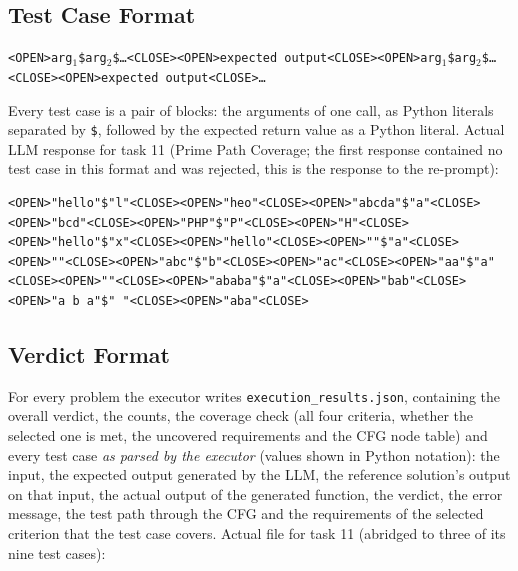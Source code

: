 \documentclass[12pt, a4paper]{article}
\begin{document}
\subsection{Test Case Format}

\begin{center}
\texttt{<OPEN>arg$_1$\$arg$_2$\$\ldots<CLOSE><OPEN>expected output<CLOSE><OPEN>arg$_1$\$arg$_2$\$\ldots<CLOSE><OPEN>expected output<CLOSE>\ldots}
\end{center}
Every test case is a pair of blocks: the arguments of one call, as Python literals separated by \texttt{\$}, followed by the expected return value as a Python literal. Actual LLM response for task 11 (Prime Path Coverage; the first response contained no test case in this format and was rejected, this is the response to the re-prompt):

\begin{lstlisting}[style=plain, caption={Generated test cases, task 11}]
<OPEN>"hello"$"l"<CLOSE><OPEN>"heo"<CLOSE><OPEN>"abcda"$"a"<CLOSE><OPEN>"bcd"<CLOSE><OPEN>"PHP"$"P"<CLOSE><OPEN>"H"<CLOSE><OPEN>"hello"$"x"<CLOSE><OPEN>"hello"<CLOSE><OPEN>""$"a"<CLOSE><OPEN>""<CLOSE><OPEN>"abc"$"b"<CLOSE><OPEN>"ac"<CLOSE><OPEN>"aa"$"a"<CLOSE><OPEN>""<CLOSE><OPEN>"ababa"$"a"<CLOSE><OPEN>"bab"<CLOSE><OPEN>"a b a"$" "<CLOSE><OPEN>"aba"<CLOSE>
\end{lstlisting}

\subsection{Verdict Format}

For every problem the executor writes \texttt{execution\_results.json}, containing the overall verdict, the counts, the coverage check (all four criteria, whether the selected one is met, the uncovered requirements and the CFG node table) and every test case \emph{as parsed by the executor} (values shown in Python notation): the input, the expected output generated by the LLM, the reference solution's output on that input, the actual output of the generated function, the verdict, the error message, the test path through the CFG and the requirements of the selected criterion that the test case covers. Actual file for task 11 (abridged to three of its nine test cases):
\end{document}
